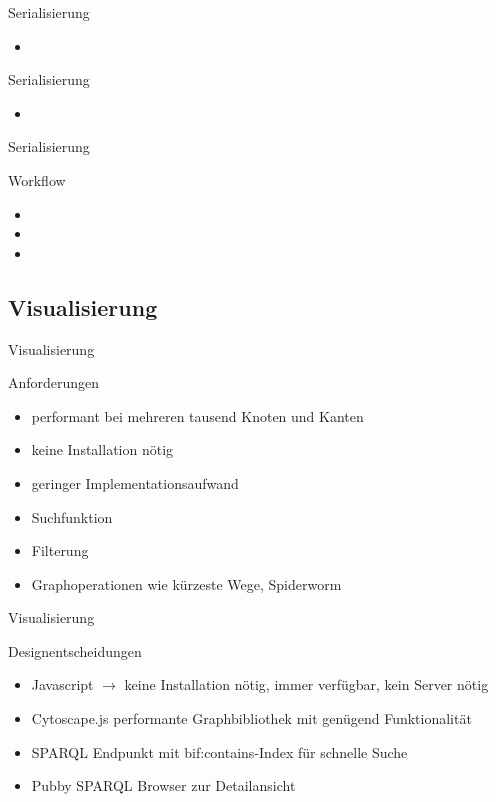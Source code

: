 \documentclass[14pt,aspectratio=1610]{beamer}
\begin{document}
\begin{frame}{Serialisierung}
\begin{block}{}
\begin{itemize}
\item 
\end{itemize}
\end{block}
\end{frame}

\begin{frame}{Serialisierung}
\begin{block}{}
\begin{itemize}
\item 
\end{itemize}
\end{block}
\end{frame}

\begin{frame}{Serialisierung}
\begin{block}{Workflow}
\begin{itemize}
\item
\item
\item 
\end{itemize}
\end{block}
\end{frame}

\subsection{Visualisierung}%

\begin{frame}{Visualisierung}
\begin{block}{Anforderungen}
\begin{itemize}
\item performant bei mehreren tausend Knoten und Kanten 
\item keine Installation nötig
\item geringer Implementationsaufwand
\item Suchfunktion
\item Filterung
\item Graphoperationen wie kürzeste Wege, Spiderworm
\end{itemize}
\end{block}
\end{frame}

\begin{frame}{Visualisierung}
\begin{block}{Designentscheidungen}
\begin{itemize}
\item Javascript $\rightarrow$ keine Installation nötig, immer verfügbar, kein Server nötig
\item Cytoscape.js performante Graphbibliothek mit genügend Funktionalität
\item SPARQL Endpunkt mit bif:contains-Index für schnelle Suche
\item Pubby SPARQL Browser zur Detailansicht 
\end{itemize}
\end{block}
\end{frame}
\end{document}
